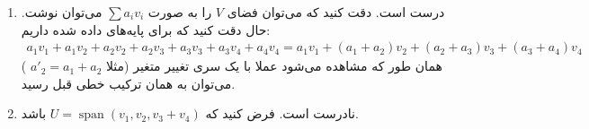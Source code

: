 \begin{enumerate}[wide, labelwidth=!, labelindent=0pt]
    \item درست است.
دقت کنید که می‌توان فضای
$V$
را به صورت
$\sum a_i v_i$
می‌توان نوشت. حال دقت کنید که برای پایه‌های داده شده داریم:
\begin{gather*}
    a_1 v_1 + a_1 v_2 + a_2 v_2 + a_2 v_3 + a_3 v_3 + a_3 v_4 + a_4 v_4 = 
    a_1 v_1 + (a_1 + a_2) v_2 + (a_2 + a_3) v_3 + (a_3 + a_4) v_4
\end{gather*}
همان طور که مشاهده می‌شود عملا با یک سری تغییر متغیر
(مثلا
$a'_2 = a_1 + a_2$
)
می‌توان به همان ترکیب خطی قبل رسید.
    \item نادرست است.
فرض کنید که
$U = \operatorname{span}(v_1, v_2, v_3 + v_4)$
باشد.
\end{enumerate}